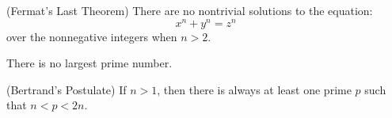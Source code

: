 \documentclass[twoside,12pt]{article}
\begin{document}
\begin{problem}{24}
(Fermat's Last Theorem) There are no nontrivial solutions
to the equation:
\[
x^n + y^n = z^n
\]
over the nonnegative integers when $n > 2$.


There is no largest prime number.


(Bertrand's Postulate) If $n > 1$, then there is always
at least one prime $p$ such that $n < p < 2n$.


\eparts
\end{problem}


\end{document}
